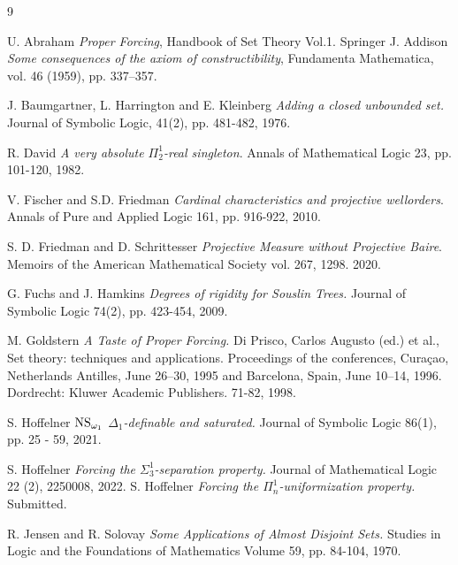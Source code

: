 \documentclass[a4paper,11pt]{article}
\begin{document}
\begin{thebibliography}{9}

U. Abraham \textit{ Proper Forcing}, Handbook of Set Theory Vol.1. Springer
 J. Addison \textit{Some consequences of the axiom of constructibility}, Fundamenta Mathematica, vol. 46 (1959), pp. 337–357.

 J. Baumgartner, L. Harrington and E. Kleinberg \textit{Adding a closed unbounded set.}  Journal of Symbolic Logic, 41(2), pp. 481-482, 1976.


R. David \textit{A very absolute $\Pi^1_2$-real singleton}. Annals of Mathematical Logic 23, pp. 101-120, 1982.

V. Fischer and S.D. Friedman 
\textit{Cardinal characteristics and projective wellorders}. 
Annals of Pure and Applied Logic 161, pp. 916-922, 2010.

S. D. Friedman and D. Schrittesser \textit{Projective Measure without Projective Baire}.
Memoirs of the American Mathematical Society vol. 267, 1298. 2020.

G. Fuchs and J. Hamkins \textit{Degrees of rigidity for Souslin Trees.}
Journal of Symbolic Logic 74(2), pp. 423-454, 2009.

 M. Goldstern \textit{A Taste of Proper Forcing.} Di Prisco, Carlos Augusto (ed.) et al., Set theory: techniques and applications. Proceedings of the conferences, Curaçao, Netherlands Antilles, June 26–30, 1995 and Barcelona, Spain, June 10–14, 1996. Dordrecht: Kluwer Academic Publishers. 71-82, 1998.

 S. Hoffelner \textit{$\hbox{NS}_{\omega_1}$ $\Delta_1$-definable and saturated.}
Journal of Symbolic Logic 86(1), pp. 25 - 59, 2021.

 S. Hoffelner \textit{Forcing the ${\Sigma^1_3}$-separation property.}  Journal of Mathematical Logic 22 (2), 2250008, 2022.
 S. Hoffelner \textit{Forcing the $\Pi^1_n$-uniformization property.} Submitted.




R. Jensen and R. Solovay \textit{Some Applications of Almost Disjoint Sets.}
Studies in Logic and the Foundations of Mathematics
Volume 59, pp. 84-104, 1970.


\end{thebibliography}
\end{document}
